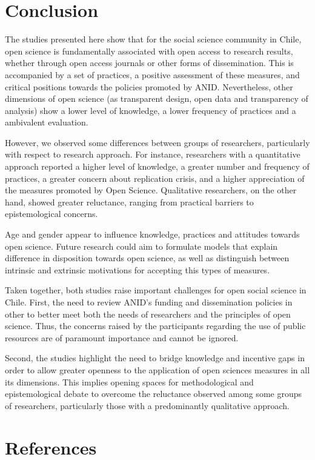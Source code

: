 \documentclass[
  english,
  letterpaper,
]{article}
\begin{document}
\section{Conclusion}\label{conclusion}

The studies presented here show that for the social science community in
Chile, open science is fundamentally associated with open access to
research results, whether through open access journals or other forms of
dissemination. This is accompanied by a set of practices, a positive
assessment of these measures, and critical positions towards the
policies promoted by ANID. Nevertheless, other dimensions of open
science (as transparent design, open data and transparency of analysis)
show a lower level of knowledge, a lower frequency of practices and a
ambivalent evaluation.

However, we observed some differences between groups of researchers,
particularly with respect to research approach. For instance,
researchers with a quantitative approach reported a higher level of
knowledge, a greater number and frequency of practices, a greater
concern about replication crisis, and a higher appreciation of the
measures promoted by Open Science. Qualitative researchers, on the other
hand, showed greater reluctance, ranging from practical barriers to
epistemological concerns.

Age and gender appear to influence knowledge, practices and attitudes
towards open science. Future research could aim to formulate models that
explain difference in disposition towards open science, as well as
distinguish between intrinsic and extrinsic motivations for accepting
this types of measures.

Taken together, both studies raise important challenges for open social
science in Chile. First, the need to review ANID's funding and
dissemination policies in other to better meet both the needs of
researchers and the principles of open science. Thus, the concerns
raised by the participants regarding the use of public resources are of
paramount importance and cannot be ignored.

Second, the studies highlight the need to bridge knowledge and incentive
gaps in order to allow greater openness to the application of open
sciences measures in all its dimensions. This implies opening spaces for
methodological and epistemological debate to overcome the reluctance
observed among some groups of researchers, particularly those with a
predominantly qualitative approach.

\section*{References}\label{references}
\end{document}

